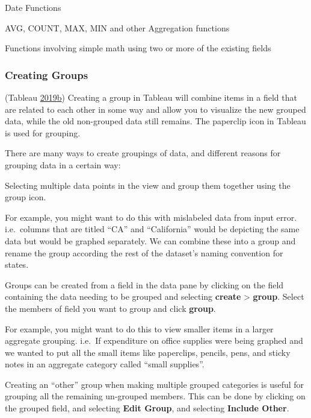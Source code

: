 \documentclass[]{book}
\begin{document}
Date Functions

AVG, COUNT, MAX, MIN and other Aggregation functions

Functions involving simple math using two or more of the existing fields

\hypertarget{creating-groups}{%
\subsubsection{Creating Groups}\label{creating-groups}}

(Tableau \protect\hyperlink{ref-Tableau_Groups}{2019}\protect\hyperlink{ref-Tableau_Groups}{b})
Creating a group in Tableau will combine items in a field that are related to each other in some way and allow you to visualize the new grouped data, while the old non-grouped data still remains. The paperclip icon in Tableau is used for grouping.

There are many ways to create groupings of data, and different reasons for grouping data in a certain way:

Selecting multiple data points in the view and group them together using the group icon.

For example, you might want to do this with mislabeled data from input error. i.e.~columns that are titled ``CA'' and ``California'' would be depicting the same data but would be graphed separately. We can combine these into a group and rename the group according the rest of the dataset's naming convention for states.

Groups can be created from a field in the data pane by clicking on the field containing the data needing to be grouped and selecting \textbf{create} \textgreater{} \textbf{group}. Select the members of field you want to group and click \textbf{group}.

For example, you might want to do this to view smaller items in a larger aggregate grouping. i.e.~If expenditure on office supplies were being graphed and we wanted to put all the small items like paperclips, pencils, pens, and sticky notes in an aggregate category called ``small supplies''.

Creating an ``other'' group when making multiple grouped categories is useful for grouping all the remaining un-grouped members. This can be done by clicking on the grouped field, and selecting \textbf{Edit Group}, and selecting \textbf{Include Other}.
\end{document}
